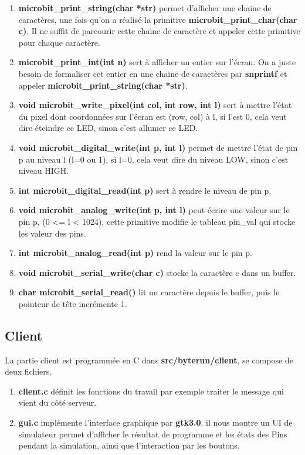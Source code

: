 \documentclass[14px]{article}
\begin{document}
\begin{enumerate}
		\item \textbf{microbit\_print\_string(char *str)} permet d'afficher une chaine de caractères, une fois qu'on a réalisé la primitive \textbf{microbit\_print\_char(char c)}. Il ne suffit de parcourir cette chaine de caractère et appeler cette primitive pour chaque caractère.
		\item \textbf{microbit\_print\_int(int n)} sert à afficher un entier sur l'écran. On a juste besoin de formaliser cet entier en une chaine de caractères par \textbf{snprintf} et appeler \textbf{microbit\_print\_string(char *str)}.
		\item \textbf{void microbit\_write\_pixel(int col, int row, int l)} sert à mettre l'état du pixel dont coordonnées sur l'écran est (row, col) à l, si l’est 0, cela veut dire éteindre ce LED, sinon c'est allumer ce LED.
		\item \textbf{void microbit\_digital\_write(int p, int l)} permet de mettre l'état de pin p au niveau l (l=0 ou 1), si l=0, cela veut dire du niveau LOW, sinon c'est niveau HIGH.
		\item \textbf{int microbit\_digital\_read(int p)} sert à rendre le niveau de pin p.
		\item \textbf{void microbit\_analog\_write(int p, int l)} peut écrire une valeur sur le pin p, (0 <= l < 1024), cette primitive modifie le tableau pin\_val qui stocke les valeur des pins.
		\item \textbf{int microbit\_analog\_read(int p)} rend la valeur sur le pin p.
		\item \textbf{void microbit\_serial\_write(char c)} stocke la caractère c dans un buffer.
		\item \textbf{char microbit\_serial\_read()} lit un caractère depuis le buffer, puis le pointeur de tête incrémente 1.


	\end{enumerate}



	\subsection{Client}
	La partie client est programmée en C dans \textbf{src/byterun/client}, se compose de deux fichiers.
	\begin{enumerate}
		\item \textbf{client.c} définit les fonctions du travail par exemple traiter le message qui vient du côté serveur.

		\item \textbf{gui.c} implémente l'interface graphique par \textbf{gtk3.0}.
		il nous montre un UI de simulateur permet d'afficher le résultat de programme et les états des Pins pendant la simulation, ainsi que l'interaction par les boutons.\\
	\end{enumerate}
\end{document}

